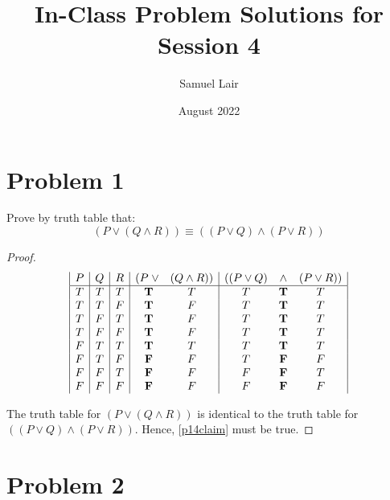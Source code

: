 \documentclass{article}
\title{In-Class Problem Solutions for Session 4}
\author{Samuel Lair}
\date{August 2022}
\begin{document}
\maketitle
\tableofcontents

\pagebreak

\section{Problem 1}

Prove by truth table that:
\begin{equation}\label{p14claim}
	(P \lor (Q \land R)) \equiv ((P \lor Q) \land (P \lor R))
\end{equation}

\begin{proof}
	\[
		\begin{array}{|c|c|c|c c|c c c|}
			P & Q & R & (P \; \lor    & (Q \land R)) & ((P \lor Q) & \land      & (P \lor R)) \\
			\hline
			T & T & T & \; \mathbf{T} & T            & T           & \mathbf{T} & T           \\
			T & T & F & \; \mathbf{T} & F            & T           & \mathbf{T} & T           \\
			T & F & T & \; \mathbf{T} & F            & T           & \mathbf{T} & T           \\
			T & F & F & \; \mathbf{T} & F            & T           & \mathbf{T} & T           \\
			F & T & T & \; \mathbf{T} & T            & T           & \mathbf{T} & T           \\
			F & T & F & \; \mathbf{F} & F            & T           & \mathbf{F} & F           \\
			F & F & T & \; \mathbf{F} & F            & F           & \mathbf{F} & T           \\
			F & F & F & \; \mathbf{F} & F            & F           & \mathbf{F} & F
		\end{array}
	\]

	The truth table for $(P \lor (Q \land R))$ is identical to the truth table for $((P \lor Q) \land (P \lor R))$. Hence, \eqref{p14claim} must be true.
\end{proof}

\pagebreak

\section{Problem 2}
\end{document}
